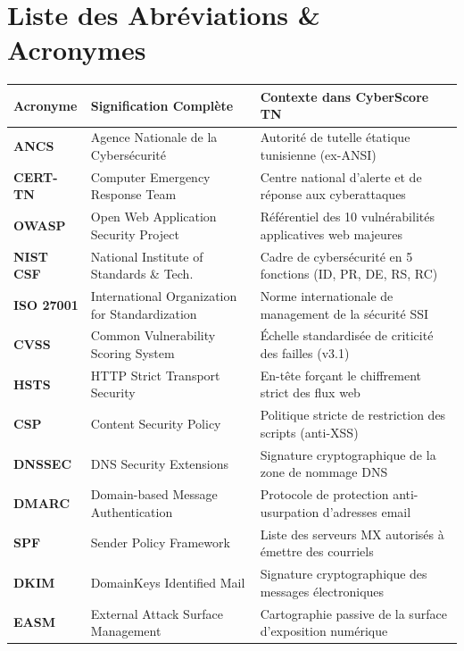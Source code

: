 \newpage
\thispagestyle{plain}
\chapter*{Liste des Abréviations \& Acronymes}

\vspace{0.2cm}

\noindent
\begin{singlespace}
{\footnotesize
\renewcommand{\arraystretch}{1.0}
\begin{tabularx}{\textwidth}{l p{5.2cm} X}
\toprule
\textbf{Acronyme} & \textbf{Signification Complète} & \textbf{Contexte dans CyberScore TN} \\
\midrule
\textbf{ANCS} & Agence Nationale de la Cybersécurité & Autorité de tutelle étatique tunisienne (ex-ANSI) \\
\textbf{CERT-TN} & Computer Emergency Response Team & Centre national d'alerte et de réponse aux cyberattaques \\
\textbf{OWASP} & Open Web Application Security Project & Référentiel des 10 vulnérabilités applicatives web majeures \\
\textbf{NIST CSF} & National Institute of Standards \& Tech. & Cadre de cybersécurité en 5 fonctions (ID, PR, DE, RS, RC) \\
\textbf{ISO 27001} & International Organization for Standardization & Norme internationale de management de la sécurité SSI \\
\textbf{CVSS} & Common Vulnerability Scoring System & Échelle standardisée de criticité des failles (v3.1) \\
\textbf{HSTS} & HTTP Strict Transport Security & En-tête forçant le chiffrement strict des flux web \\
\textbf{CSP} & Content Security Policy & Politique stricte de restriction des scripts (anti-XSS) \\
\textbf{DNSSEC} & DNS Security Extensions & Signature cryptographique de la zone de nommage DNS \\
\textbf{DMARC} & Domain-based Message Authentication & Protocole de protection anti-usurpation d'adresses email \\
\textbf{SPF} & Sender Policy Framework & Liste des serveurs MX autorisés à émettre des courriels \\
\textbf{DKIM} & DomainKeys Identified Mail & Signature cryptographique des messages électroniques \\
\textbf{EASM} & External Attack Surface Management & Cartographie passive de la surface d'exposition numérique \\

\end{tabularx}}
\end{singlespace}
